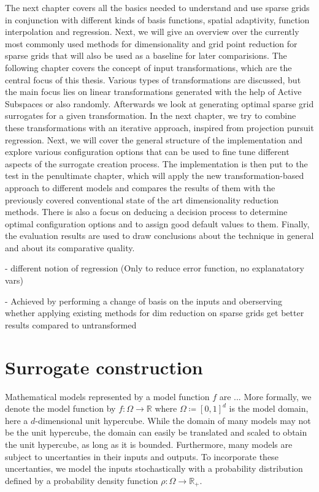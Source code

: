 \documentclass[
  a4paper,  %
  twoside,  %
  bibliography=totoc,
  headsepline,
  cleardoublepage=empty,
  parskip=half,
  draft=false
]{scrbook}
\begin{document}
The next chapter covers all the basics needed to understand and use sparse grids in conjunction with different kinds of basis functions, spatial adaptivity, function interpolation and regression.
Next, we will give an overview over the currently most commonly used methods for dimensionality and grid point reduction for sparse grids that will also be used as a baseline for later comparisions.
The following chapter covers the concept of input transformations, which are the central focus of this thesis.
Various types of transformations are discussed, but the main focus lies on linear transformations generated with the help of Active Subspaces or also randomly.
Afterwards we look at generating optimal sparse grid surrogates for a given transformation.
In the next chapter, we try to combine these transformations with an iterative approach, inspired from projection pursuit regression.
Next, we will cover the general structure of the implementation and explore various configuration options that can be used to fine tune different aspects of the surrogate creation process.
The implementation is then put to the test in the penultimate chapter, which will apply the new transformation-based approach to different models and compares the results of them with the previously covered conventional state of the art dimensionality reduction methods.
There is also a focus on deducing a decision process to determine optimal configuration options and to assign good default values to them.
Finally, the evaluation results are used to draw conclusions about the technique in general and about its comparative quality.

- different notion of regression (Only to reduce error function, no explanatatory vars)

- Achieved by performing a change of basis on the inputs and oberserving whether applying existing methods for dim reduction on sparse grids get better results compared to untransformed

\chapter{Surrogate construction}
\label{chap:c2}

Mathematical models represented by a model function $f$ are ...
More formally, we denote the model function by $f \colon \Omega \to \mathds{R}$ where $\Omega \coloneqq [0,1]^d$ is the model domain, here a $d$-dimensional unit hypercube.
While the domain of many models may not be the unit hypercube, the domain can easily be translated and scaled to obtain the unit hypercube, as long as it is bounded.
Furthermore, many models are subject to uncertanties in their inputs and outputs.
To incorporate these uncertanties, we model the inputs stochastically with a probability distribution defined by a probability density function $\rho \colon \Omega \to \mathds{R_+}$.
\end{document}
